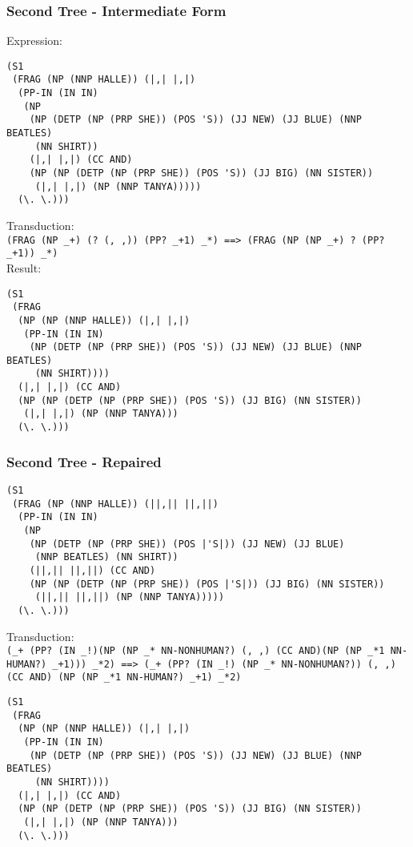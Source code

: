 \begin{frame}[fragile]
  \frametitle{Second Tree - Intermediate Form}
  Expression:\\
\begin{verbatim}
(S1
 (FRAG (NP (NNP HALLE)) (|,| |,|)
  (PP-IN (IN IN)
   (NP
    (NP (DETP (NP (PRP SHE)) (POS 'S)) (JJ NEW) (JJ BLUE) (NNP BEATLES)
     (NN SHIRT))
    (|,| |,|) (CC AND)
    (NP (NP (DETP (NP (PRP SHE)) (POS 'S)) (JJ BIG) (NN SISTER))
     (|,| |,|) (NP (NNP TANYA)))))
  (\. \.))) 
\end{verbatim}
  
  Transduction:\\
  \texttt{(FRAG (NP \_+) (? (, ,)) (PP? \_+1) \_*) ==> (FRAG (NP (NP \_+) ? (PP? \_+1)) \_*)}\\

Result:\\
\begin{verbatim}
(S1
 (FRAG
  (NP (NP (NNP HALLE)) (|,| |,|)
   (PP-IN (IN IN)
    (NP (DETP (NP (PRP SHE)) (POS 'S)) (JJ NEW) (JJ BLUE) (NNP BEATLES)
     (NN SHIRT))))
  (|,| |,|) (CC AND)
  (NP (NP (DETP (NP (PRP SHE)) (POS 'S)) (JJ BIG) (NN SISTER))
   (|,| |,|) (NP (NNP TANYA)))
  (\. \.))) 
\end{verbatim}
\end{frame}
\begin{frame}[fragile]
  \frametitle{Second Tree - Repaired}
\begin{verbatim}
(S1
 (FRAG (NP (NNP HALLE)) (||,|| ||,||)
  (PP-IN (IN IN)
   (NP
    (NP (DETP (NP (PRP SHE)) (POS |'S|)) (JJ NEW) (JJ BLUE)
     (NNP BEATLES) (NN SHIRT))
    (||,|| ||,||) (CC AND)
    (NP (NP (DETP (NP (PRP SHE)) (POS |'S|)) (JJ BIG) (NN SISTER))
     (||,|| ||,||) (NP (NNP TANYA)))))
  (\. \.))) 
\end{verbatim}

  Transduction:\\
  \texttt{(\_+ (PP? (IN \_!)(NP (NP \_* NN-NONHUMAN?) (, ,) (CC AND)(NP (NP \_*1 NN-HUMAN?) \_+1)))     \_*2) ==> (\_+ (PP? (IN \_!) (NP \_* NN-NONHUMAN?)) (, ,) (CC AND)  (NP (NP \_*1 NN-HUMAN?) \_+1) \_*2)}\\

\begin{verbatim}
(S1
 (FRAG
  (NP (NP (NNP HALLE)) (|,| |,|)
   (PP-IN (IN IN)
    (NP (DETP (NP (PRP SHE)) (POS 'S)) (JJ NEW) (JJ BLUE) (NNP BEATLES)
     (NN SHIRT))))
  (|,| |,|) (CC AND)
  (NP (NP (DETP (NP (PRP SHE)) (POS 'S)) (JJ BIG) (NN SISTER))
   (|,| |,|) (NP (NNP TANYA)))
  (\. \.))) 
\end{verbatim}
\end{frame}
